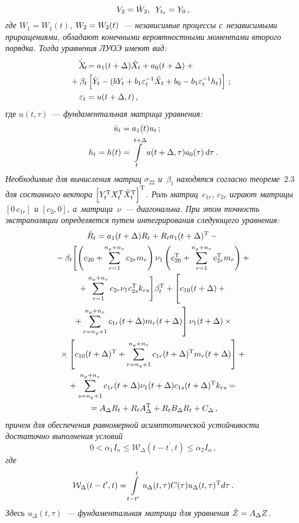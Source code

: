 \begin{multicols}{2}
          \noindent
          $$
     V_2 =\dot W_2,\enskip Y_{t_0}=Y_0\,,
$$
\textit{где $W_1=W_1(t)$, $W_2\hm=W_2(t)$~--- независимые процессы
с~независимыми приращениями, обладают конечными вероятностными
моментами второго порядка. Тогда уравнения ЛУОЭ имеют вид:}
\begin{align}
\dot{\hx_t} &=a_{1}(t+\Delta )\hx_t + a_{0} (t+\Delta) +{}\notag\\
&\hspace*{-7mm}{}+\beta_t \lk \dot Y_t -(b Y_t + b_{1} \varepsilon_t^{-1}\hx_t + b_{0} -
b_{1} \varepsilon_t^{-1}h_t) \rk\,; \label{e3.2-sk}\\
\varepsilon_t &= u(t+\Delta ,t)\,,\label{e3.3-sk}
\end{align}
где $u(t,\tau)$~--- \textit{фундаментальная матрица уравнения:}
\begin{align}
\dot u_t &= a_1 (t) u_t\,;\notag %
\\
h_t =h(t) &= \iii_t^{t+\Delta} u(t+\Delta,\tau) a_{0} (\tau)\, d\tau\,.\label{e3.5-sk}
\end{align}
\textit{Необходимые для вычисления матриц $\sigma_{22}$  и~$\beta_t$
находятся согласно теореме~$2.3$  для составного вектора
$\left[ Y_t^{\mathrm{T}} X_t^{\mathrm{T}} \hat X_t^{\mathrm{T}}\right]^{\mathrm{T}}$. Роль матриц~$c_{1r}$, $c_{2r}$ играют матрицы
$[0\, c_{1r}]$ и $[c_{2r}\, 0]$, а~матрица~$\nu$~--- диагональна.
При этом точность экстраполяции определяется путем интегрирования
следующего уравнения:}
\begin{multline*}
\dot R_t = a_{1} (t+\Delta) R_t + R_t a_{1} (t+\Delta)^{\mathrm{T}} -{}\\
{}-\beta_t \Biggl[ \left( c_{20} +\sss_{r=1}^{n_y+n_x} c_{2r} m_r\right) \nu_1
     \left( c_{20}^{\mathrm{T}} +\sss_{r=1}^{n_y+n_x} c_{2r}^{\mathrm{T}} m_r\right)+{}\\
{}+ \sss_{r=1}^{n_y+n_x} c_{2r}\nu_1 c_{2s}^{\mathrm{T}} k_{rs}\Biggr] \beta_t^{\mathrm{T}} + \left[
    \vphantom{\sss_{r=n_y+1}^{n_y+n_x}} c_{10}(t+\Delta) +{}\right.\\
     {}\left.+\sss_{r=n_y+1}^{n_y+n_x} c_{1r} (t+\Delta) m_r(t+\Delta)
     \right] \nu_1 (t+\Delta)\times{}\\
{}\times \lk c_{10} (t+\Delta)^{\mathrm{T}} +\sss_{r=n_y+1}^{n_y+n_x} c_{1r}
(t+\Delta)^{\mathrm{T}} m_r (t+\Delta)\rk+{}\\
{}+ \sss_{s=n_y+1}^{n_y+n_x} c_{1r}(t+\Delta) \nu_1 (t+\Delta) c_{1s}
(t+\Delta)^{\mathrm{T}} k_{rs}={}\\
{}= A_\Delta R_t+ R_t A_\Delta^{\mathrm{T}} + R_t B_\Delta R_t + C_\Delta\,, %
\end{multline*}
\textit{причем для обеспечения равномерной асимптотической устойчивости
достаточно выполнения условий}
$$
0< \alpha_1 I_n \le \mathcal{W}_\Delta (t-t^\prime, t) \le \alpha_2 I_n\,, %
$$
\textit{где}
    $$
    \mathcal{W}_\Delta (t-t^\prime, t) = \iii_{t-t^\prime}^t u_\Delta (t, \tau)
    C(\tau) u_\Delta (t,\tau)^{\mathrm{T}} d\tau\,. %
    $$
\textit{Здесь $u_\Delta (t,\tau)$~--- фундаментальная матрица для уравнения
$\dot Z \hm= A_\Delta Z$.}


\end{multicols}
